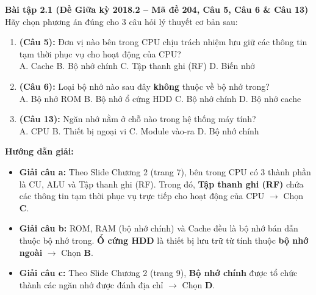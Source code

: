 \textbf{Bài tập 2.1 (Đề Giữa kỳ 2018.2 -- Mã đề 204, Câu 5, Câu 6 \& Câu 13)}\\
Hãy chọn phương án đúng cho 3 câu hỏi lý thuyết cơ bản sau:
\begin{enumerate}[label=\alph*)]
    \item \textbf{(Câu 5):} Đơn vị nào bên trong CPU chịu trách nhiệm lưu giữ các thông tin tạm thời phục vụ cho hoạt động của CPU?\\
    A. Cache \quad B. Bộ nhớ chính \quad C. Tập thanh ghi (RF) \quad D. Biến nhớ
    \item \textbf{(Câu 6):} Loại bộ nhớ nào sau đây \textbf{không} thuộc về bộ nhớ trong?\\
    A. Bộ nhớ ROM \quad B. Bộ nhớ ổ cứng HDD \quad C. Bộ nhớ chính \quad D. Bộ nhớ cache
    \item \textbf{(Câu 13):} Ngăn nhớ nằm ở chỗ nào trong hệ thống máy tính?\\
    A. CPU \quad B. Thiết bị ngoại vi \quad C. Module vào-ra \quad D. Bộ nhớ chính
\end{enumerate}
\textbf{Hướng dẫn giải:}
\begin{itemize}
    \item \textbf{Giải câu a:} Theo Slide Chương 2 (trang 7), bên trong CPU có 3 thành phần là CU, ALU và Tập thanh ghi (RF). Trong đó, \textbf{Tập thanh ghi (RF)} chứa các thông tin tạm thời phục vụ trực tiếp cho hoạt động của CPU $\rightarrow$ Chọn \textbf{C}.
    \item \textbf{Giải câu b:} ROM, RAM (bộ nhớ chính) và Cache đều là bộ nhớ bán dẫn thuộc bộ nhớ trong. \textbf{Ổ cứng HDD} là thiết bị lưu trữ từ tính thuộc \textbf{bộ nhớ ngoài} $\rightarrow$ Chọn \textbf{B}.
    \item \textbf{Giải câu c:} Theo Slide Chương 2 (trang 9), \textbf{Bộ nhớ chính} được tổ chức thành các ngăn nhớ được đánh địa chỉ $\rightarrow$ Chọn \textbf{D}.
\end{itemize}

